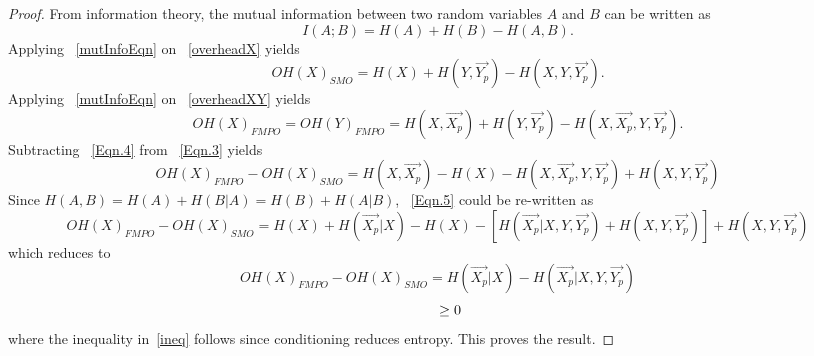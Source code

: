 \documentclass[conference]{IEEEtran}
\theoremstyle{definition}
\begin{document}
\begin{proof}
From information theory, the mutual information between two random variables $A$ and $B$ can be written as
\begin{equation} 
I(A;B)=H(A) + H(B) - H(A,B).
\label{mutInfoEqn}
\end{equation}
Applying ~\eqref{mutInfoEqn} on ~\eqref{overheadX} yields
\begin{equation}
OH(X)_{SMO}= H(X)+H(Y,\vec{Y_p})-H(X,Y,\vec{Y_p}).
\label{Eqn.4}
\end{equation}
Applying ~\eqref{mutInfoEqn} on ~\eqref{overheadXY} yields
\begin{equation}
OH(X)_{FMPO}=OH(Y)_{FMPO}= H(X,\vec{X_p})+H(Y,\vec{Y_p})-H(X,\vec{X_p},Y,\vec{Y_p}).
\label{Eqn.3}
\end{equation}
Subtracting ~\eqref{Eqn.4} from ~\eqref{Eqn.3} yields 
\begin{equation}
OH(X)_{FMPO}-OH(X)_{SMO}=H(X,\vec{X_p})-H(X)-H(X,\vec{X_p},Y,\vec{Y_p})+H(X,Y,\vec{Y_p})
\label{Eqn.5}
\end{equation}
Since $H(A,B) = H(A) + H(B|A) = H(B) + H(A|B) $, ~\eqref{Eqn.5} could be re-written as
\begin{equation}
OH(X)_{FMPO}-OH(X)_{SMO}=H(X)+H(\vec{X_p}|X)-H(X)-[H(\vec{X_p}|X,Y,\vec{Y_p})+H(X,Y,\vec{Y_p})] + H(X,Y,\vec{Y_p})
\nonumber
\end{equation}
which reduces to 
\begin{equation}
OH(X)_{FMPO}-OH(X)_{SMO}=H(\vec{X_p}|X)- H(\vec{X_p}|X,Y,\vec{Y_p})
\label{lasteqn}
\end{equation}
\begin{equation}
\hspace*{0.6 cm} \ge 0
\label{ineq}
\end{equation}
where the inequality in~\eqref{ineq} follows since conditioning reduces entropy. This proves the result.
\end{proof}
%
\end{document}
